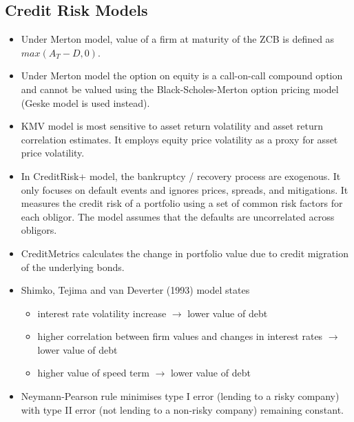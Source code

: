 \subsection{Credit Risk Models}
\begin{itemize}
	\item Under Merton model, value of a firm at maturity of the ZCB is defined as $max(A_T - D, 0)$.
	\item Under Merton model the option on equity is a call-on-call compound option and cannot be valued using the Black-Scholes-Merton option pricing model (Geske model is used instead).
	\item KMV model is most sensitive to asset return volatility and asset return correlation estimates. It employs equity price volatility as a proxy for asset price volatility.
	\item In CreditRisk+ model, the bankruptcy / recovery process are exogenous. It only focuses on default events and ignores prices, spreads, and mitigations. It measures the credit risk of a portfolio using a set of common risk factors for each obligor. The model assumes that the defaults are uncorrelated across obligors.
	\item CreditMetrics calculates the change in portfolio value due to credit migration of the underlying bonds.
	\item Shimko, Tejima and van Deverter (1993) model states
	\begin{itemize}
		\item interest rate volatility increase $\rightarrow$ lower value of debt
		\item higher correlation between firm values and changes in interest rates $\rightarrow$ lower value of debt
		\item higher value of speed term $\rightarrow$ lower value of debt
	\end{itemize}
	\item Neymann-Pearson rule minimises type I error (lending to a risky company) with type II error (not lending to a non-risky company) remaining constant.
\end{itemize}

